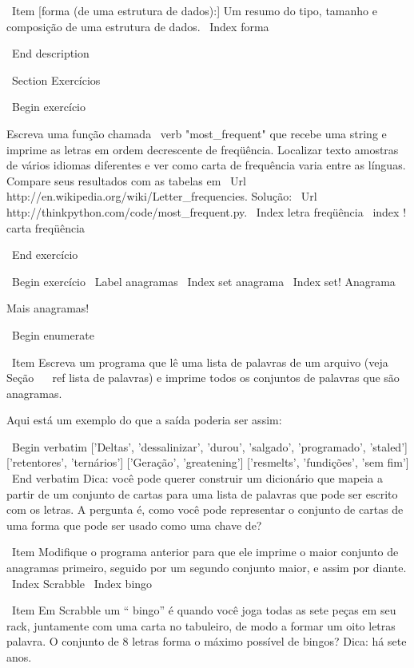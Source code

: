 \documentclass[10pt]{book}
\begin{document}
{{{{{{{{{\ Item [forma (de uma estrutura de dados):] Um resumo do tipo,
tamanho e composição de uma estrutura de dados.
\ Index {} forma

\ End {description}


\ Section {Exercícios}

\ Begin {} exercício

Escreva uma função chamada \ verb "most_frequent" que recebe uma string e
imprime as letras em ordem decrescente de freqüência. Localizar texto
amostras de vários idiomas diferentes e ver como carta de frequência
varia entre as línguas. Compare seus resultados com as tabelas em
\ Url {http://en.wikipedia.org/wiki/Letter_frequencies}. Solução:
\ Url {http://thinkpython.com/code/most_frequent.py}. \ Index {letra
  freqüência} \ index {! carta freqüência}

\ End {} exercício


\ Begin {} exercício
\ Label {} anagramas
\ Index {set anagrama}
\ Index {set! Anagrama}

Mais anagramas!

\ Begin {enumerate}

\ Item Escreva um programa
que lê uma lista de palavras de um arquivo (veja Seção ~ \ ref {lista de palavras}) e
imprime todos os conjuntos de palavras que são anagramas.

Aqui está um exemplo do que a saída poderia ser assim:

\ Begin {verbatim}
['Deltas', 'dessalinizar', 'durou', 'salgado', 'programado', 'staled']
['retentores', 'ternários']
['Geração', 'greatening']
['resmelts', 'fundições', 'sem fim']
\ End {verbatim}
%
Dica: você pode querer construir um dicionário que mapeia a partir de um
conjunto de cartas para uma lista de palavras que pode ser escrito com os
letras. A pergunta é, como você pode representar o conjunto de
cartas de uma forma que pode ser usado como uma chave de?

\ Item Modifique o programa anterior para que ele imprime o maior conjunto
de anagramas primeiro, seguido por um segundo conjunto maior, e assim por diante.
\ Index {} Scrabble
\ Index {} bingo

\ Item Em Scrabble um `` bingo'' é quando você joga todas as sete peças em
seu rack, juntamente com uma carta no tabuleiro, de modo a formar um oito letras
palavra. O conjunto de 8 letras forma o máximo possível de bingos?
Dica: há sete anos.


}}}}}}}}}
\end{document}
